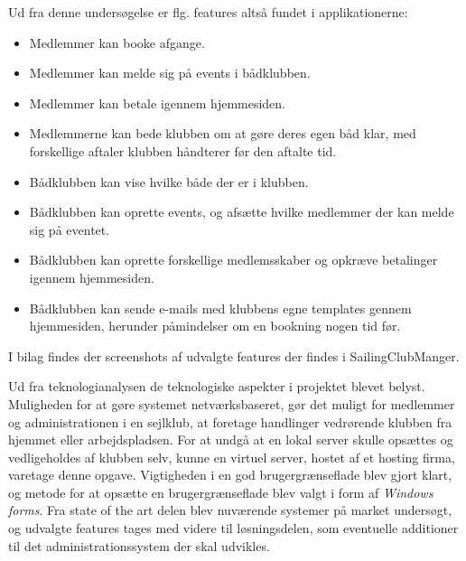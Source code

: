 Ud fra denne undersøgelse er flg. features altså fundet i applikationerne:

\begin{itemize}
	\item Medlemmer kan booke afgange.
	\item Medlemmer kan melde sig på events i bådklubben.
	\item Medlemmer kan betale igennem hjemmesiden.
	\item Medlemmerne kan bede klubben om at gøre deres egen båd klar, med forskellige aftaler klubben håndterer
        før den aftalte tid.
	\item Bådklubben kan vise hvilke både der er i klubben.
	\item Bådklubben kan oprette events, og afsætte hvilke medlemmer der kan melde sig på eventet.
	\item Bådklubben kan oprette forskellige medlemsskaber og opkræve betalinger igennem hjemmesiden.
	\item Bådklubben kan sende e-mails med klubbens egne templates gennem hjemmesiden, herunder påmindelser om en
        bookning nogen tid før.
\end{itemize}

I bilag  findes der screenshots af udvalgte features der findes i SailingClubManger.

Ud fra teknologianalysen de teknologiske aspekter i projektet blevet belyst. 
Muligheden for at gøre systemet netværksbaseret, gør det muligt for medlemmer og administrationen i en sejlklub, at foretage handlinger vedrørende klubben fra hjemmet eller arbejdspladsen. 
For at undgå at en lokal server skulle opsættes og vedligeholdes af klubben selv, kunne en virtuel server, hostet af et hosting firma, varetage denne opgave.
Vigtigheden i en god brugergrænseflade blev gjort klart, og metode for at opsætte en brugergrænseflade blev valgt i form af \textit{Windows forms}.
Fra state of the art delen blev nuværende systemer på market undersøgt, og udvalgte features tages med videre til løsningsdelen, som eventuelle additioner til det administrationssystem der skal udvikles.  

